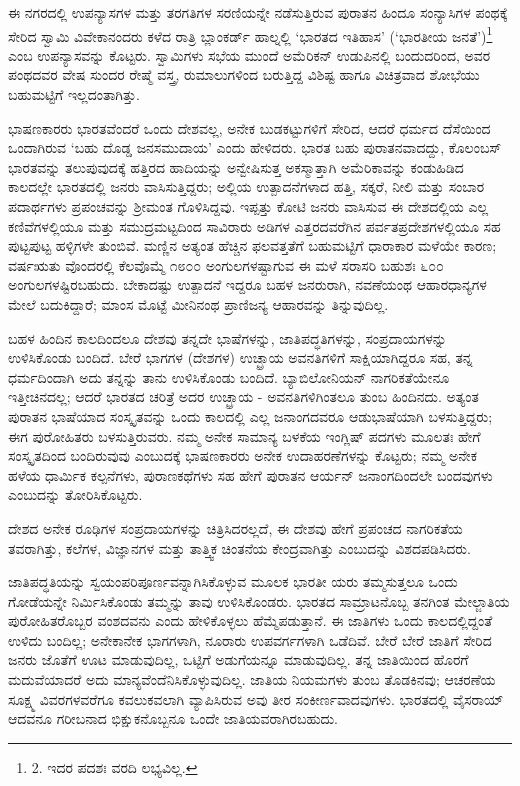 ಈ ನಗರದಲ್ಲಿ ಉಪನ್ಯಾಸಗಳ ಮತ್ತು ತರಗತಿಗಳ ಸರಣಿಯನ್ನೇ ನಡೆಸುತ್ತಿರುವ ಪುರಾತನ ಹಿಂದೂ ಸಂನ್ಯಾಸಿಗಳ ಪಂಥಕ್ಕೆ ಸೇರಿದ ಸ್ವಾಮಿ ವಿವೇಕಾನಂದರು ಕಳೆದ ರಾತ್ರಿ ಬ್ಲಾಂಕರ್ಡ್ ಹಾಲ್ನಲ್ಲಿ ‘ಭಾರತದ ಇತಿಹಾಸ’ (‘ಭಾರತೀಯ ಜನತೆ’)\footnote{2. ಇದರ ಪದಶಃ ವರದಿ ಲಭ್ಯವಿಲ್ಲ.} ಎಂಬ ಉಪನ್ಯಾಸವನ್ನು ಕೊಟ್ಟರು. ಸ್ವಾಮಿಗಳು ಸಭೆಯ ಮುಂದೆ ಅಮೆರಿಕನ್ ಉಡುಪಿನಲ್ಲಿ ಬಂದುದರಿಂದ, ಅವರ ಪಂಥದವರ ವೇಷ ಸುಂದರ ರೇಷ್ಮೆ ವಸ್ತ್ರ, ರುಮಾಲುಗಳಿಂದ ಬರುತ್ತಿದ್ದ ವಿಶಿಷ್ಟ ಹಾಗೂ ವಿಚಿತ್ರವಾದ ಶೋಭೆಯು ಬಹುಮಟ್ಟಿಗೆ ಇಲ್ಲದಂತಾಗಿತ್ತು.

ಭಾಷಣಕಾರರು ಭಾರತವೆಂದರೆ ಒಂದು ದೇಶವಲ್ಲ, ಅನೇಕ ಬುಡಕಟ್ಟುಗಳಿಗೆ ಸೇರಿದ, ಆದರೆ ಧರ್ಮದ ದೆಸೆಯಿಂದ ಒಂದಾಗಿರುವ ‘ಬಹು ದೊಡ್ಡ ಜನಸಮುದಾಯ’ ಎಂದು ಹೇಳಿದರು. ಭಾರತ ಬಹು ಪುರಾತನವಾದದ್ದು, ಕೊಲಂಬಸ್ ಭಾರತವನ್ನು ತಲುಪುವುದಕ್ಕೆ ಹತ್ತಿರದ ಹಾದಿಯನ್ನು ಅನ್ವೇಷಿಸುತ್ತ ಅಕಸ್ಮಾತ್ತಾಗಿ ಅಮೆರಿಕಾವನ್ನು ಕಂಡುಹಿಡಿದ ಕಾಲದಲ್ಲೇ ಭಾರತದಲ್ಲಿ ಜನರು ವಾಸಿಸುತ್ತಿದ್ದರು; ಅಲ್ಲಿಯ ಉತ್ಪಾದನೆಗಳಾದ ಹತ್ತಿ, ಸಕ್ಕರೆ, ನೀಲಿ ಮತ್ತು ಸಂಬಾರ ಪದಾರ್ಥಗಳು ಪ್ರಪಂಚವನ್ನು ಶ‍್ರೀಮಂತ ಗೊಳಿಸಿದ್ದವು. ಇಪ್ಪತ್ತು ಕೋಟಿ ಜನರು ವಾಸಿಸುವ ಈ ದೇಶದಲ್ಲಿಯ ಎಲ್ಲ ಕಣಿವೆಗಳಲ್ಲಿಯೂ ಮತ್ತು ಸಮುದ್ರಮಟ್ಟದಿಂದ ಸಾವಿರಾರು ಅಡಿಗಳ ಎತ್ತರದವರೆಗಿನ ಪರ್ವತಪ್ರದೇಶಗಳಲ್ಲಿಯೂ ಸಹ ಪುಟ್ಟಪುಟ್ಟ ಹಳ್ಳಿಗಳೇ ತುಂಬಿವೆ. ಮಣ್ಣಿನ ಅತ್ಯಂತ ಹೆಚ್ಚಿನ ಫಲವತ್ತತೆಗೆ ಬಹುಮಟ್ಟಿಗೆ ಧಾರಾಕಾರ ಮಳೆಯೇ ಕಾರಣ; ವರ್ಷಋತು ವೊಂದರಲ್ಲಿ ಕೆಲವೊಮ್ಮೆ ೧೮೦೦ ಅಂಗುಲಗಳಷ್ಟಾಗುವ ಈ ಮಳೆ ಸರಾಸರಿ ಬಹುಶಃ ೬೦೦ ಅಂಗುಲಗಳಷ್ಟಿರಬಹುದು. ಬೇಕಾದಷ್ಟು ಉತ್ಪಾದನೆ ಇದ್ದರೂ ಬಹಳ ಜನರುರಾಗಿ, ನವಣೆಯಂಥ ಆಹಾರಧಾನ್ಯಗಳ ಮೇಲೆ ಬದುಕಿದ್ದಾರೆ; ಮಾಂಸ ಮೊಟ್ಟೆ ಮೀನಿನಂಥ ಪ್ರಾಣಿಜನ್ಯ ಆಹಾರವನ್ನು ತಿನ್ನುವುದಿಲ್ಲ.

ಬಹಳ ಹಿಂದಿನ ಕಾಲದಿಂದಲೂ ದೇಶವು ತನ್ನದೇ ಭಾಷೆಗಳನ್ನು, ಜಾತಿಪದ್ಧತಿಗಳನ್ನು, ಸಂಪ್ರದಾಯಗಳನ್ನು ಉಳಿಸಿಕೊಂಡು ಬಂದಿದೆ. ಬೇರೆ ಭಾಗಗಳ (ದೇಶಗಳ) ಉಚ್ಛ್ರಾಯ ಅವನತಿಗಳಿಗೆ ಸಾಕ್ಷಿಯಾಗಿದ್ದರೂ ಸಹ, ತನ್ನ ಧರ್ಮದಿಂದಾಗಿ ಅದು ತನ್ನನ್ನು ತಾನು ಉಳಿಸಿಕೊಂಡು ಬಂದಿದೆ. ಬ್ಯಾಬಿಲೋನಿಯನ್ ನಾಗರಿಕತೆಯೇನೂ ಇತ್ತೀಚಿನದಲ್ಲ; ಆದರೆ ಭಾರತದ ಚರಿತ್ರೆ ಅದರ ಉಚ್ಛ್ರಾಯ - ಅವನತಿಗಳಿಗಿಂತಲೂ ತುಂಬ ಹಿಂದಿನದು. ಅತ್ಯಂತ ಪುರಾತನ ಭಾಷೆಯಾದ ಸಂಸ್ಕೃತವನ್ನು ಒಂದು ಕಾಲದಲ್ಲಿ ಎಲ್ಲ ಜನಾಂಗದವರೂ ಆಡುಭಾಷೆಯಾಗಿ ಬಳಸುತ್ತಿದ್ದರು; ಈಗ ಪುರೋಹಿತರು ಬಳಸುತ್ತಿರುವರು. ನಮ್ಮ ಅನೇಕ ಸಾಮಾನ್ಯ ಬಳಕೆಯ ಇಂಗ್ಲಿಷ್ ಪದಗಳು ಮೂಲತಃ ಹೇಗೆ ಸಂಸ್ಕೃತದಿಂದ ಬಂದಿರುವುವು ಎಂಬುದಕ್ಕೆ ಭಾಷಣಕಾರರು ಅನೇಕ ಉದಾಹರಣೆಗಳನ್ನು ಕೊಟ್ಟರು; ನಮ್ಮ ಅನೇಕ ಹಳೆಯ ಧಾರ್ಮಿಕ ಕಲ್ಪನೆಗಳು, ಪುರಾಣಕಥೆಗಳು ಸಹ ಹೇಗೆ ಪುರಾತನ ಆರ್ಯನ್ ಜನಾಂಗದಿಂದಲೇ ಬಂದವುಗಳು ಎಂಬುದನ್ನು ತೋರಿಸಿಕೊಟ್ಟರು.

ದೇಶದ ಅನೇಕ ರೂಢಿಗಳ ಸಂಪ್ರದಾಯಗಳನ್ನು ಚಿತ್ರಿಸಿದರಲ್ಲದೆ, ಈ ದೇಶವು ಹೇಗೆ ಪ್ರಪಂಚದ ನಾಗರಿಕತೆಯ ತವರಾಗಿತ್ತು, ಕಲೆಗಳ, ವಿಜ್ಞಾನಗಳ ಮತ್ತು ತಾತ್ತ್ವಿಕ ಚಿಂತನೆಯ ಕೇಂದ್ರವಾಗಿತ್ತು ಎಂಬುದನ್ನು ವಿಶದಪಡಿಸಿದರು.

ಜಾತಿಪದ್ಧತಿಯನ್ನು ಸ್ವಯಂಪರಿಪೂರ್ಣವನ್ನಾಗಿಸಿಕೊಳ್ಳುವ ಮೂಲಕ ಭಾರತೀ ಯರು ತಮ್ಮಸುತ್ತಲೂ ಒಂದು ಗೋಡೆಯನ್ನೇ ನಿರ್ಮಿಸಿಕೊಂಡು ತಮ್ಮನ್ನು ತಾವು ಉಳಿಸಿಕೊಂಡರು. ಭಾರತದ ಸಾಮ್ರಾಟನೊಬ್ಬ ತನಗಿಂತ ಮೇಲ್ಜಾತಿಯ ಪುರೋಹಿತರೊಬ್ಬರ ವಂಶದವನು ಎಂದು ಹೇಳಿಕೊಳ್ಳಲು ಹೆಮ್ಮೆಪಡುತ್ತಾನೆ. ಈ ಜಾತಿಗಳು ಒಂದು ಕಾಲದಲ್ಲಿದ್ದಂತೆ ಉಳಿದು ಬಂದಿಲ್ಲ; ಅನೇಕಾನೇಕ ಭಾಗಗಳಾಗಿ, ನೂರಾರು ಉಪವರ್ಗಗಳಾಗಿ ಒಡೆದಿವೆ. ಬೇರೆ ಬೇರೆ ಜಾತಿಗೆ ಸೇರಿದ ಜನರು ಜೊತೆಗೆ ಊಟ ಮಾಡುವುದಿಲ್ಲ, ಒಟ್ಟಿಗೆ ಅಡುಗೆಯನ್ನೂ ಮಾಡುವುದಿಲ್ಲ. ತನ್ನ ಜಾತಿಯಿಂದ ಹೊರಗೆ ಮದುವೆಯಾದರೆ ಅದು ಮಾನ್ಯವೆಂದೆನಿಸಿಕೊಳ್ಳುವುದಿಲ್ಲ. ಜಾತಿಯ ನಿಯಮಗಳು ತುಂಬ ತೊಡಕಿನವು; ಆಚರಣೆಯ ಸೂಕ್ಷ್ಮ ವಿವರಗಳವರೆಗೂ ಕವಲುಕವಲಾಗಿ ವ್ಯಾಪಿಸಿರುವ ಅವು ತೀರ ಸಂಕೀರ್ಣವಾದವುಗಳು. ಭಾರತದಲ್ಲಿ ವೈಸರಾಯ್​ ಆದವನೂ ಗರೀಬನಾದ ಭಿಕ್ಷುಕನೊಬ್ಬನೂ ಒಂದೇ ಜಾತಿಯವರಾಗಿರಬಹುದು.

